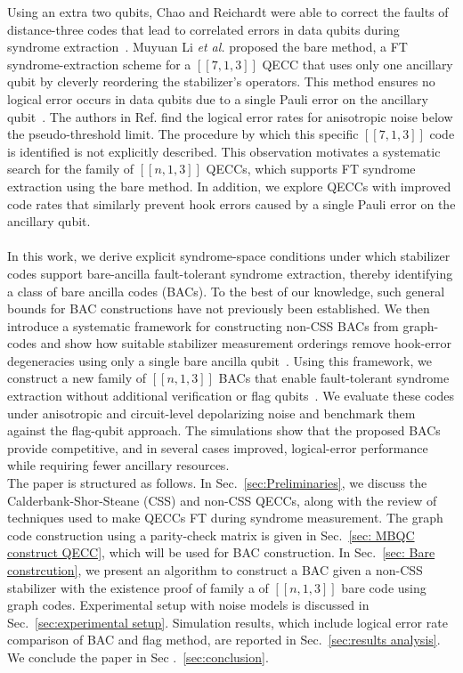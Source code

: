 \documentclass[reprint, amsmath,amssymb, aps,pra,
 floatfix,
]{revtex4-2}
\begin{document}
Using an extra two qubits, Chao and Reichardt were able to correct the faults of distance-three codes that lead to correlated errors in data qubits during syndrome extraction~\cite{PhysRevLett.121.050502}.
Muyuan Li \emph{et al.} proposed the bare method, a FT syndrome-extraction scheme for a $[[7,1,3]]$ QECC that uses only one ancillary qubit by cleverly reordering the stabilizer's operators.
This method ensures no logical error occurs in data qubits due to a single Pauli error on the ancillary qubit~\cite{Muyuna}.
The authors in Ref. \cite{Muyuna} find the logical error rates for anisotropic noise below the pseudo-threshold limit. 
The procedure by which this specific $[[7,1,3]]$ code is identified is not explicitly described.
This observation motivates a systematic search for the family of $[[n,1,3]]$ QECCs, which supports FT syndrome extraction using the bare method. 
In addition, we explore QECCs with improved code rates that similarly prevent hook errors caused by a single Pauli error on the ancillary qubit.\\\\
\noindent In this work, we derive explicit syndrome-space conditions under which stabilizer codes support bare-ancilla fault-tolerant syndrome extraction, thereby identifying a class of bare ancilla codes (BACs).
To the best of our knowledge, such general bounds for BAC constructions have not previously been established.
We then introduce a systematic framework for constructing non-CSS BACs from graph-codes and show how suitable stabilizer measurement orderings remove hook-error degeneracies using only a single bare ancilla qubit~\cite{Schlingemann_2001, PhysRevA.69.022316,cafaro:hal-02287093,schlingemann2001stabilizercodesrealizedgraph}.
Using this framework, we construct a new family of \([[n,1,3]]\) BACs that enable fault-tolerant syndrome extraction without additional verification or flag qubits~\cite{PhysRevLett.121.050502}.
We evaluate these codes under anisotropic and circuit-level depolarizing noise and benchmark them against the flag-qubit approach.
The simulations show that the proposed BACs provide competitive, and in several cases improved, logical-error performance while requiring fewer ancillary resources.\\
\noindent The paper is structured as follows. In Sec.~\ref{sec:Preliminaries}, we discuss the Calderbank-Shor-Steane (CSS) and non-CSS QECCs, along with the review of techniques used to make  QECCs FT during syndrome measurement. 
The graph code construction using a parity-check matrix is given in Sec.~\ref{sec: MBQC construct QECC}, which will be used for BAC construction.
In Sec.~\ref{sec: Bare constrcution}, we present an algorithm to construct a BAC given a non-CSS stabilizer with the existence proof of family a of $[[n,1,3]]$ bare code using graph codes.
Experimental setup with noise models is discussed in Sec.~\ref{sec:experimental setup}.
Simulation results, which include logical error rate comparison of BAC and flag method, are reported in Sec.~\ref {sec:results analysis}.
We conclude the paper in Sec .~\ref {sec:conclusion}.
\end{document}
